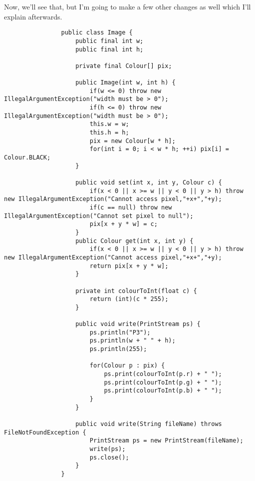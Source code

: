 \documentclass{article}
\begin{document}
            Now, we'll see that, but I'm going to make a few other changes as well which I'll explain afterwards.
            
            \begin{verbatim}
                public class Image {
                    public final int w;
                    public final int h;

                    private final Colour[] pix;

                    public Image(int w, int h) {
                        if(w <= 0) throw new IllegalArgumentException("width must be > 0");
                        if(h <= 0) throw new IllegalArgumentException("width must be > 0");
                        this.w = w;
                        this.h = h;
                        pix = new Colour[w * h];
                        for(int i = 0; i < w * h; ++i) pix[i] = Colour.BLACK;
                    }

                    public void set(int x, int y, Colour c) {
                        if(x < 0 || x >= w || y < 0 || y > h) throw new IllegalArgumentException("Cannot access pixel,"+x+","+y);
                        if(c == null) throw new IllegalArgumentException("Cannot set pixel to null");
                        pix[x + y * w] = c;
                    }
                    public Colour get(int x, int y) {
                        if(x < 0 || x >= w || y < 0 || y > h) throw new IllegalArgumentException("Cannot access pixel,"+x+","+y);
                        return pix[x + y * w];
                    }

                    private int colourToInt(float c) {
                        return (int)(c * 255);
                    }

                    public void write(PrintStream ps) {
                        ps.println("P3");
                        ps.println(w + " " + h);
                        ps.println(255);
        
                        for(Colour p : pix) {
                            ps.print(colourToInt(p.r) + " ");
                            ps.print(colourToInt(p.g) + " ");
                            ps.print(colourToInt(p.b) + " ");
                        }
                    }
    
                    public void write(String fileName) throws FileNotFoundException {
                        PrintStream ps = new PrintStream(fileName);
                        write(ps);
                        ps.close();
                    }
                }
            \end{verbatim}
        
\end{document}
